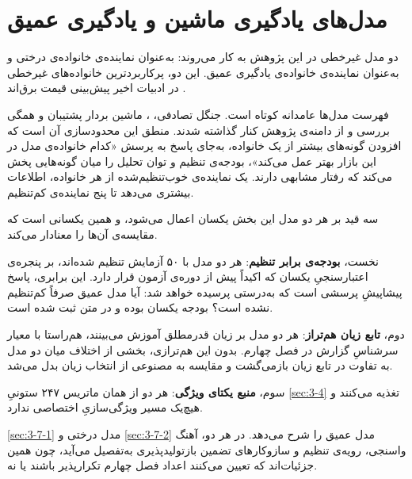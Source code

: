
\section{مدل‌های یادگیری ماشین و یادگیری عمیق}
\label{sec:3-7}

دو مدل غیرخطی در این پژوهش به کار می‌روند:  به‌عنوان نماینده‌ی خانواده‌ی
درختی و  به‌عنوان نماینده‌ی خانواده‌ی یادگیری عمیق. این دو، پرکاربردترین
خانواده‌های غیرخطی در ادبیات اخیر پیش‌بینی قیمت برق‌اند
\cite{jiang_review_2018, oconnor_review_2025}.

فهرست مدل‌ها عامدانه کوتاه است. جنگل تصادفی، ، ماشین بردار پشتیبان و
 همگی بررسی و از دامنه‌ی پژوهش کنار گذاشته شدند. منطق این محدودسازی آن است که
افزودن گونه‌های بیشتر از یک خانواده، به‌جای پاسخ به پرسش «کدام خانواده‌ی مدل در این
بازار بهتر عمل می‌کند»، بودجه‌ی تنظیم و توان تحلیل را میان گونه‌هایی پخش می‌کند که
رفتار مشابهی دارند. یک نماینده‌ی خوب‌تنظیم‌شده از هر خانواده، اطلاعات بیشتری می‌دهد تا
پنج نماینده‌ی کم‌تنظیم.

سه قید بر هر دو مدل این بخش یکسان اعمال می‌شود، و همین یکسانی است که مقایسه‌ی آن‌ها را
معنادار می‌کند.

نخست، \textbf{بودجه‌ی برابر تنظیم}: هر دو مدل با ۵۰ آزمایش  تنظیم شده‌اند،
بر پنجره‌ی اعتبارسنجیِ یکسان که اکیداً پیش از دوره‌ی آزمون قرار دارد. این برابری، پاسخ
پیشاپیشِ پرسشی است که به‌درستی پرسیده خواهد شد: آیا مدل عمیق صرفاً کم‌تنظیم نشده
است؟ بودجه یکسان بوده و در متن ثبت شده است.

دوم، \textbf{تابع زیان هم‌تراز}: هر دو مدل بر زیان قدرمطلق آموزش می‌بینند، هم‌راستا
با معیار سرشناسِ گزارش در فصل چهارم. بدون این هم‌ترازی، بخشی از اختلاف میان دو مدل
به تفاوت در تابع زیان بازمی‌گشت و مقایسه به مصنوعی از انتخاب زیان بدل می‌شد.

سوم، \textbf{منبع یکتای ویژگی}: هر دو از همان ماتریس ۲۴۷ ستونیِ \cref{sec:3-4} تغذیه
می‌کنند و هیچ‌یک مسیر ویژگی‌سازیِ اختصاصی ندارد.

\cref{sec:3-7-1} مدل درختی و \cref{sec:3-7-2} مدل عمیق را شرح می‌دهد. در هر دو، آهنگ واسنجی، رویه‌ی
تنظیم و سازوکارهای تضمین بازتولیدپذیری به‌تفصیل می‌آید، چون همین جزئیات‌اند که
تعیین می‌کنند اعداد فصل چهارم تکرارپذیر باشند یا نه.
